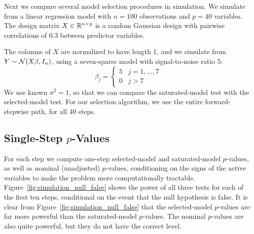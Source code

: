 \documentclass{article}
\begin{document}
Next we compare several model selection procedures in simulation. We simulate from a linear regression model with $n=100$ observations and $p=40$ variables. The design matrix $X\in\mathbb{R}^{n\times p}$ is a random Gaussian design with pairwise correlations of 0.3 between predictor variables.

The columns of $X$ are normalized to have length 1, and we simulate from $Y \sim \mathcal{N}(X\beta,I_n)$, using a seven-sparse model with signal-to-noise ratio 5:
\[
\beta_j = \left\{\begin{matrix}5 & j = 1,\ldots,7\\ 0 &
    j>7\end{matrix}\right.
\]
We use known $\sigma^2=1$, so that we can compare the saturated-model test with the selected-model test. For our selection algorithm, we use the entire forward-stepwise path, for all 40 steps. 

\subsection{Single-Step $p$-Values}

For each step we compute one-step selected-model and saturated-model $p$-values, as well as nominal (unadjusted) $p$-values, conditioning on the signs of the active variables to make the problem more computationally tractable. Figure~\ref{fig:simulation_null_false} shows the power of all three tests for each of the first ten steps, conditional on the event that the null hypothesis is false. It is clear from Figure~\ref{fig:simulation_null_false} that the selected-model $p$-values are far more powerful than the saturated-model $p$-values. The nominal $p$-values are also quite powerful, but they do not have the correct level.
\end{document}
